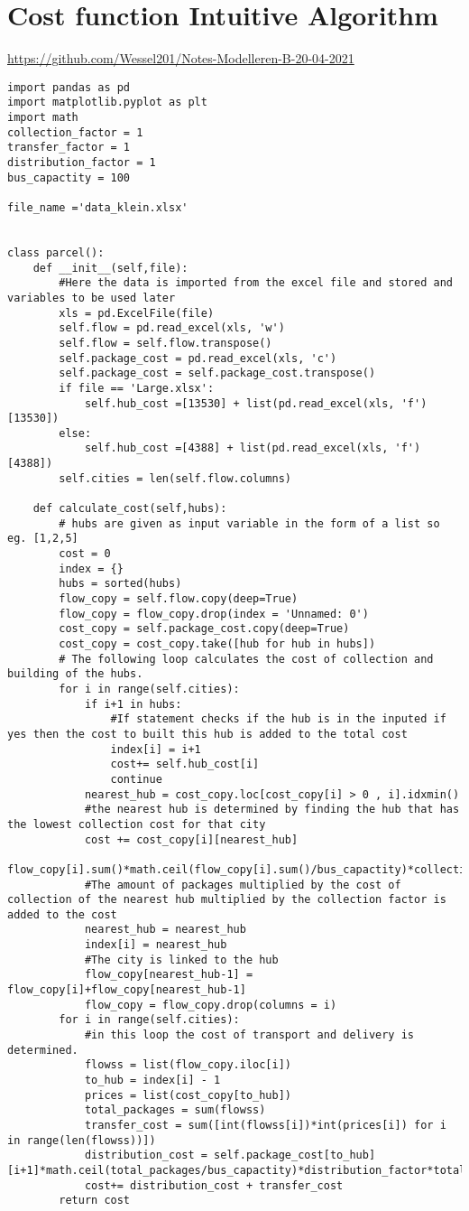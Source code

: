 \documentclass{article}
\begin{document}
\section{Cost function Intuitive Algorithm}
\url{https://github.com/Wessel201/Notes-Modelleren-B-20-04-2021}
\label{CostFunction}
\begin{verbatim}
import pandas as pd 
import matplotlib.pyplot as plt
import math
collection_factor = 1
transfer_factor = 1
distribution_factor = 1
bus_capactity = 100

file_name ='data_klein.xlsx'


class parcel():
    def __init__(self,file):
        #Here the data is imported from the excel file and stored and variables to be used later
        xls = pd.ExcelFile(file)
        self.flow = pd.read_excel(xls, 'w')
        self.flow = self.flow.transpose()
        self.package_cost = pd.read_excel(xls, 'c')
        self.package_cost = self.package_cost.transpose()
        if file == 'Large.xlsx':
            self.hub_cost =[13530] + list(pd.read_excel(xls, 'f')[13530])
        else:
            self.hub_cost =[4388] + list(pd.read_excel(xls, 'f')[4388])
        self.cities = len(self.flow.columns)

    def calculate_cost(self,hubs):
		# hubs are given as input variable in the form of a list so eg. [1,2,5]
        cost = 0
        index = {} 
        hubs = sorted(hubs)
        flow_copy = self.flow.copy(deep=True)
        flow_copy = flow_copy.drop(index = 'Unnamed: 0')
        cost_copy = self.package_cost.copy(deep=True)
        cost_copy = cost_copy.take([hub for hub in hubs])
        # The following loop calculates the cost of collection and building of the hubs. 
        for i in range(self.cities):
            if i+1 in hubs:
                #If statement checks if the hub is in the inputed if yes then the cost to built this hub is added to the total cost
                index[i] = i+1
                cost+= self.hub_cost[i]
                continue
            nearest_hub = cost_copy.loc[cost_copy[i] > 0 , i].idxmin()
            #the nearest hub is determined by finding the hub that has the lowest collection cost for that city 
            cost += cost_copy[i][nearest_hub]
            flow_copy[i].sum()*math.ceil(flow_copy[i].sum()/bus_capactity)*collection_factor
            #The amount of packages multiplied by the cost of collection of the nearest hub multiplied by the collection factor is added to the cost 
            nearest_hub = nearest_hub 
            index[i] = nearest_hub
            #The city is linked to the hub 
            flow_copy[nearest_hub-1] = flow_copy[i]+flow_copy[nearest_hub-1]
            flow_copy = flow_copy.drop(columns = i)
        for i in range(self.cities):
            #in this loop the cost of transport and delivery is determined. 
            flowss = list(flow_copy.iloc[i])
            to_hub = index[i] - 1 
            prices = list(cost_copy[to_hub])
            total_packages = sum(flowss)
            transfer_cost = sum([int(flowss[i])*int(prices[i]) for i in range(len(flowss))])
            distribution_cost = self.package_cost[to_hub][i+1]*math.ceil(total_packages/bus_capactity)*distribution_factor*total_packages
            cost+= distribution_cost + transfer_cost
        return cost


\end{verbatim}
\end{document}
